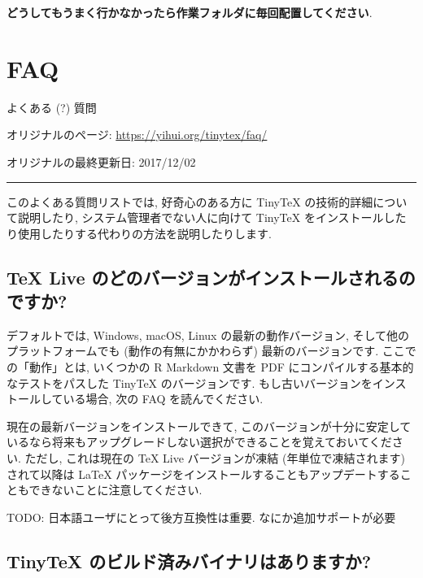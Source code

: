 \documentclass[
  xelatex,ja=standard,jafont=noto]{bxjsreport}
\begin{document}
\textbf{どうしてもうまく行かなかったら作業フォルダに毎回配置してください}.

\hypertarget{faq}{%
\chapter{FAQ}\label{faq}}

よくある (?) 質問

オリジナルのページ: \url{https://yihui.org/tinytex/faq/}

オリジナルの最終更新日: 2017/12/02

\begin{center}\rule{0.5\linewidth}{0.5pt}\end{center}

このよくある質問リストでは, 好奇心のある方に TinyTeX
の技術的詳細について説明したり, システム管理者でない人に向けて TinyTeX
をインストールしたり使用したりする代わりの方法を説明したりします.

\hypertarget{tex-live-ux306eux3069ux306eux30d0ux30fcux30b8ux30e7ux30f3ux304cux30a4ux30f3ux30b9ux30c8ux30fcux30ebux3055ux308cux308bux306eux3067ux3059ux304b}{%
\section{TeX Live
のどのバージョンがインストールされるのですか?}\label{tex-live-ux306eux3069ux306eux30d0ux30fcux30b8ux30e7ux30f3ux304cux30a4ux30f3ux30b9ux30c8ux30fcux30ebux3055ux308cux308bux306eux3067ux3059ux304b}}

デフォルトでは, Windows, macOS, Linux の最新の動作バージョン,
そして他のプラットフォームでも (動作の有無にかかわらず)
最新のバージョンです. ここでの「動作」とは, いくつかの R Markdown 文書を
PDF にコンパイルする基本的なテストをパスした TinyTeX のバージョンです.
もし古いバージョンをインストールしている場合, 次の FAQ を読んでください.

現在の最新バージョンをインストールできて,
このバージョンが十分に安定しているなら将来もアップグレードしない選択ができることを覚えておいてください.
ただし, これは現在の TeX Live バージョンが凍結 (年単位で凍結されます)
されて以降は LaTeX
パッケージをインストールすることもアップデートすることもできないことに注意してください.

TODO: 日本語ユーザにとって後方互換性は重要. なにか追加サポートが必要

\hypertarget{tinytex-ux306eux30d3ux30ebux30c9ux6e08ux307fux30d0ux30a4ux30caux30eaux306fux3042ux308aux307eux3059ux304b}{%
\section{TinyTeX
のビルド済みバイナリはありますか?}\label{tinytex-ux306eux30d3ux30ebux30c9ux6e08ux307fux30d0ux30a4ux30caux30eaux306fux3042ux308aux307eux3059ux304b}}
\end{document}
